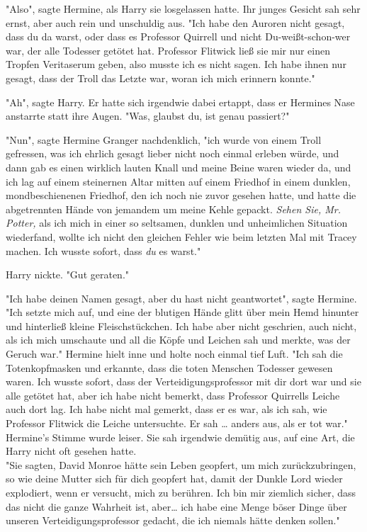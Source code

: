 {"Also", sagte Hermine, als Harry sie losgelassen hatte. Ihr junges Gesicht sah sehr ernst, aber auch rein und unschuldig aus. "Ich habe den Auroren nicht gesagt, dass du da warst, oder dass es Professor Quirrell und nicht Du-weißt-schon-wer war, der alle Todesser getötet hat. Professor Flitwick ließ sie mir nur einen Tropfen Veritaserum geben, also musste ich es nicht sagen. Ich habe ihnen nur gesagt, dass der Troll das Letzte war, woran ich mich erinnern konnte."

"Ah", sagte Harry. Er hatte sich irgendwie dabei ertappt, dass er Hermines Nase anstarrte statt ihre Augen. "Was, glaubst du, ist genau passiert?"

"Nun", sagte Hermine Granger nachdenklich, "ich wurde von einem Troll gefressen, was ich ehrlich gesagt lieber nicht noch einmal erleben würde, und dann gab es einen wirklich lauten Knall und meine Beine waren wieder da, und ich lag auf einem steinernen Altar mitten auf einem Friedhof in einem dunklen, mondbeschienenen Friedhof, den ich noch nie zuvor gesehen hatte, und hatte die abgetrennten Hände von jemandem um meine Kehle gepackt. \emph{Sehen Sie, Mr. Potter,} als ich mich in einer so seltsamen, dunklen und unheimlichen Situation wiederfand, wollte ich nicht den gleichen Fehler wie beim letzten Mal mit Tracey machen. Ich wusste sofort, dass \emph{du} es warst."

Harry nickte. "Gut geraten."

"Ich habe deinen Namen gesagt, aber du hast nicht geantwortet", sagte Hermine. "Ich setzte mich auf, und eine der blutigen Hände glitt über mein Hemd hinunter und hinterließ kleine Fleischstückchen. Ich habe aber nicht geschrien, auch nicht, als ich mich umschaute und all die Köpfe und Leichen sah und merkte, was der Geruch war." Hermine hielt inne und holte noch einmal tief Luft. "Ich sah die Totenkopfmasken und erkannte, dass die toten Menschen Todesser gewesen waren. Ich wusste sofort, dass der Verteidigungsprofessor mit dir dort war und sie alle getötet hat, aber ich habe nicht bemerkt, dass Professor Quirrells Leiche auch dort lag. Ich habe nicht mal gemerkt, dass er es war, als ich sah, wie Professor Flitwick die Leiche untersuchte. Er sah … anders aus, als er tot war."\\ Hermine's Stimme wurde leiser. Sie sah irgendwie demütig aus, auf eine Art, die Harry nicht oft gesehen hatte.\\ "Sie sagten, David Monroe hätte sein Leben geopfert, um mich zurückzubringen, so wie deine Mutter sich für dich geopfert hat, damit der Dunkle Lord wieder explodiert, wenn er versucht, mich zu berühren. Ich bin mir ziemlich sicher, dass das nicht die ganze Wahrheit ist, aber… ich habe eine Menge böser Dinge über unseren Verteidigungsprofessor gedacht, die ich niemals hätte denken sollen."

}
